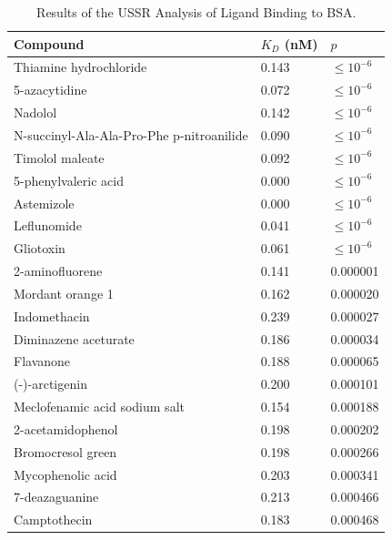 \begin{table}[h!]
\caption{Results of the USSR Analysis of Ligand Binding to BSA.}
\begin{center}
\begin{tabular}{l | l l}
  \hline
  {\bf Compound} & {\bf $K_D$ (nM)} & {\bf $p$} \\
  \hline
  Thiamine hydrochloride                    & 0.143 & $\le 10^{-6}$ \\
  5-azacytidine                             & 0.072 & $\le 10^{-6}$ \\
  Nadolol                                   & 0.142 & $\le 10^{-6}$ \\
  N-succinyl-Ala-Ala-Pro-Phe p-nitroanilide & 0.090 & $\le 10^{-6}$ \\
  Timolol maleate                           & 0.092 & $\le 10^{-6}$ \\
  5-phenylvaleric acid                      & 0.000 & $\le 10^{-6}$ \\
  Astemizole                                & 0.000 & $\le 10^{-6}$ \\
  Leflunomide                               & 0.041 & $\le 10^{-6}$ \\
  Gliotoxin                                 & 0.061 & $\le 10^{-6}$ \\
  2-aminofluorene                           & 0.141 & 0.000001 \\
  Mordant orange 1                          & 0.162 & 0.000020 \\
  Indomethacin                              & 0.239 & 0.000027 \\
  Diminazene aceturate                      & 0.186 & 0.000034 \\
  Flavanone                                 & 0.188 & 0.000065 \\
  (-)-arctigenin                            & 0.200 & 0.000101 \\
  Meclofenamic acid sodium salt             & 0.154 & 0.000188 \\
  2-acetamidophenol                         & 0.198 & 0.000202 \\
  Bromocresol green                         & 0.198 & 0.000266 \\
  Mycophenolic acid                         & 0.203 & 0.000341 \\
  7-deazaguanine                            & 0.213 & 0.000466 \\
  Camptothecin                              & 0.183 & 0.000468 \\

\end{tabular}
\end{center}
\end{table}
